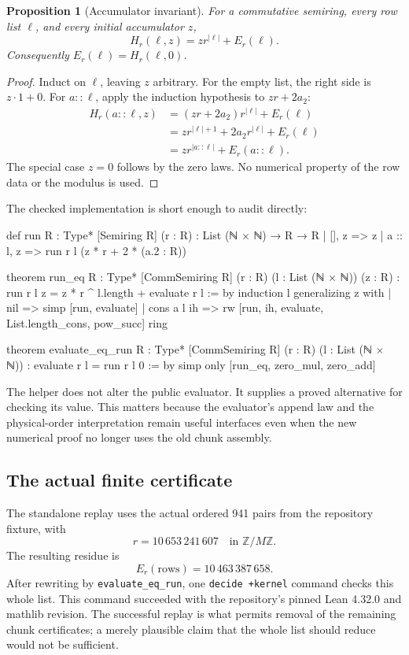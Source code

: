\documentclass[11pt,a4paper]{article}
\newcommand{\code}[1]{\texttt{#1}}
\newtheorem{proposition}{Proposition}[section]
\begin{document}
\begin{proposition}[Accumulator invariant]
For a commutative semiring, every row list \(\ell\), and every initial accumulator \(z\),
\[
 H_r(\ell,z)=z r^{|\ell|}+E_r(\ell).
\]
Consequently \(E_r(\ell)=H_r(\ell,0)\).
\end{proposition}

\begin{proof}
Induct on \(\ell\), leaving \(z\) arbitrary. For the empty list, the right side is \(z\cdot1+0\). For \(a::\ell\), apply the induction hypothesis to \(zr+2a_2\):
\begin{align*}
 H_r(a::\ell,z)
 &= (zr+2a_2)r^{|\ell|}+E_r(\ell)\\
 &= z r^{|\ell|+1}+2a_2r^{|\ell|}+E_r(\ell)\\
 &= z r^{|a::\ell|}+E_r(a::\ell).
\end{align*}
The special case \(z=0\) follows by the zero laws. No numerical property of the row data or the modulus is used.
\end{proof}

The checked implementation is short enough to audit directly:
\begin{Lean}
def run {R : Type*} [Semiring R] (r : R) :
    List (ℕ × ℕ) → R → R
  | [], z => z
  | a :: l, z => run r l (z * r + 2 * (a.2 : R))

theorem run_eq {R : Type*} [CommSemiring R] (r : R)
    (l : List (ℕ × ℕ)) (z : R) :
    run r l z = z * r ^ l.length + evaluate r l := by
  induction l generalizing z with
  | nil => simp [run, evaluate]
  | cons a l ih =>
    rw [run, ih, evaluate, List.length_cons, pow_succ]
    ring

theorem evaluate_eq_run {R : Type*} [CommSemiring R]
    (r : R) (l : List (ℕ × ℕ)) :
    evaluate r l = run r l 0 := by
  simp only [run_eq, zero_mul, zero_add]
\end{Lean}

The helper does not alter the public evaluator. It supplies a proved alternative for checking its value. This matters because the evaluator's append law and the physical-order interpretation remain useful interfaces even when the new numerical proof no longer uses the old chunk assembly.

\subsection{The actual finite certificate}

The standalone replay uses the actual ordered 941 pairs from the repository fixture, with
\[
 r=10\,653\,241\,607\quad\text{in }\mathbb Z/M\mathbb Z.
\]
The resulting residue is
\[
 E_r(\mathrm{rows})=10\,463\,387\,658.
\]
After rewriting by \code{evaluate\_eq\_run}, one \code{decide +kernel} command checks this whole list. This command succeeded with the repository's pinned Lean 4.32.0 and mathlib revision. The successful replay is what permits removal of the remaining chunk certificates; a merely plausible claim that the whole list should reduce would not be sufficient.
\end{document}
